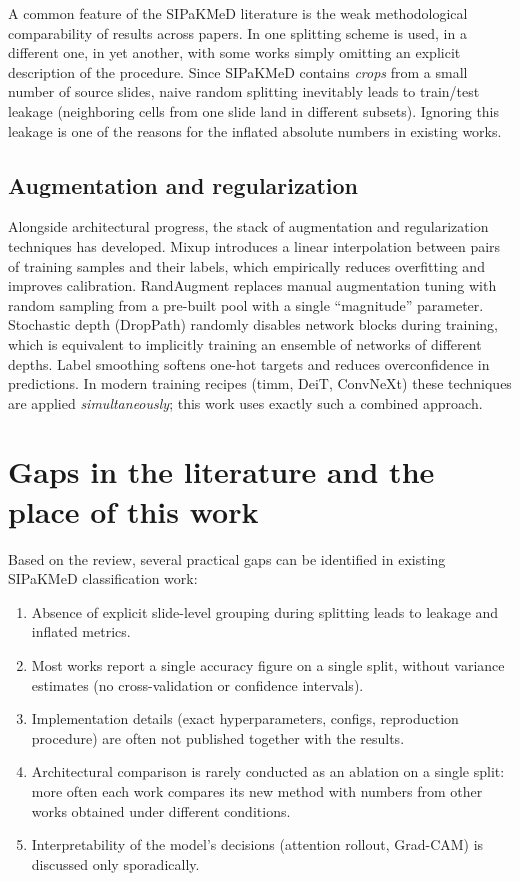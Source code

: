 \documentclass[14pt,a4paper]{extreport}
\begin{document}
A common feature of the SIPaKMeD literature is the weak methodological
comparability of results across papers. In \cite{plissiti2018sipakmed}
one splitting scheme is used, in \cite{cerviformer2023} a different one,
in \cite{hybridvit2025} yet another, with some works simply omitting an
explicit description of the procedure. Since SIPaKMeD contains
\textit{crops} from a small number of source slides, naive random
splitting inevitably leads to train/test leakage (neighboring cells from
one slide land in different subsets). Ignoring this leakage is one of
the reasons for the inflated absolute numbers in existing works.

\subsection{Augmentation and regularization}

Alongside architectural progress, the stack of augmentation and
regularization techniques has developed. Mixup \cite{zhang2018mixup}
introduces a linear interpolation between pairs of training samples and
their labels, which empirically reduces overfitting and improves
calibration. RandAugment \cite{cubuk2020randaugment} replaces manual
augmentation tuning with random sampling from a pre-built pool with a
single ``magnitude'' parameter. Stochastic depth (DropPath)
\cite{huang2016deep} randomly disables network blocks during training,
which is equivalent to implicitly training an ensemble of networks of
different depths. Label smoothing softens one-hot targets and reduces
overconfidence in predictions. In modern training recipes (timm, DeiT,
ConvNeXt) these techniques are applied \textit{simultaneously}; this
work uses exactly such a combined approach.

\section{Gaps in the literature and the place of this work}

Based on the review, several practical gaps can be identified in
existing SIPaKMeD classification work:
\begin{enumerate}
    \item Absence of explicit slide-level grouping during splitting
          leads to leakage and inflated metrics.
    \item Most works report a single accuracy figure on a single split,
          without variance estimates (no cross-validation or confidence
          intervals).
    \item Implementation details (exact hyperparameters, configs,
          reproduction procedure) are often not published together with
          the results.
    \item Architectural comparison is rarely conducted as an ablation on
          a single split: more often each work compares its new method
          with numbers from other works obtained under different
          conditions.
    \item Interpretability of the model's decisions (attention rollout,
          Grad-CAM) is discussed only sporadically.
\end{enumerate}
\end{document}
